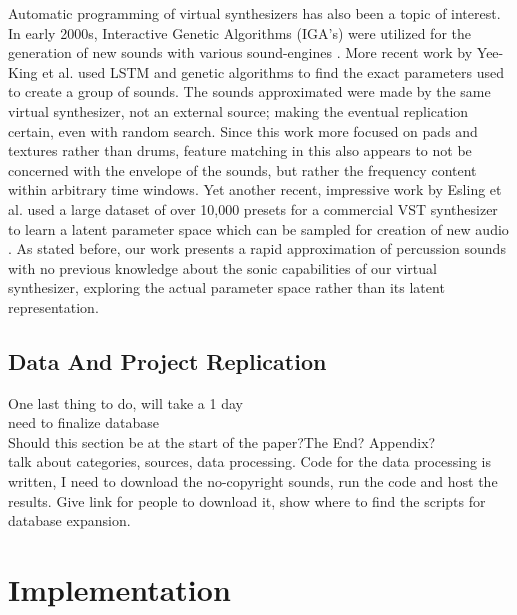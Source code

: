 \documentclass{nime-alternate} %
\begin{document}
Automatic programming of virtual synthesizers has also been a topic of interest. In early 2000s, Interactive Genetic Algorithms (IGA's) were utilized for the generation of new sounds with various sound-engines \cite{johnson1999exploring,dahlstedt2001creating}. More recent work by Yee-King et al. \cite{yee2018automatic} used LSTM and genetic algorithms to find the exact parameters used to create a group of sounds. The sounds approximated were made by the same virtual synthesizer, not an external source; making the eventual replication certain, even with random search. Since this work more focused on pads and textures rather than drums, feature matching in this also appears to not be concerned with the envelope of the sounds, but rather the frequency content within arbitrary time windows. Yet another recent, impressive work by Esling et al. used a large dataset of over 10,000 presets for a commercial VST synthesizer to learn a latent parameter space which can be sampled for creation of new audio \cite{esling2019universal}. As stated before, our work presents a rapid approximation of percussion sounds with no previous knowledge about the sonic capabilities of our virtual synthesizer, exploring the actual parameter space rather than its latent representation. 


\subsection{Data And Project Replication}
\label{data}
\colorbox{green!=30}{One last thing to do, will take a 1 day}\\
\colorbox{green!=30}{need to finalize database}\\
\colorbox{blue!=30}{Should this section be at the start of the paper?The End? Appendix?}\\
talk about  categories, sources, data processing. 
Code for the data processing is written, I need to download the no-copyright sounds, run the code and host the results. 
Give link for people to download it, show where to find the scripts for database expansion.
\section{Implementation}
\label{impl}
\end{document}
